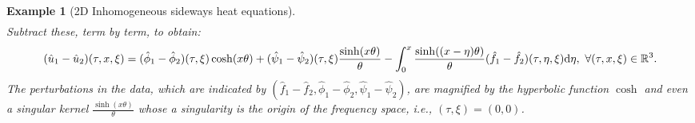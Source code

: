 \documentclass[oneside]{article}
\numberwithin{equation}{section}
\newtheorem{example}{Example}[section]
\begin{document}
\begin{example}[2D Inhomogeneous sideways heat equations]
\begin{align*}
    \end{align*}
    Subtract these, term by term, to obtain:
    \begin{align*}
        (\hat{u}_1 - \hat{u}_2)(\tau,x,\xi) = (\hat{\phi}_1 - \hat{\phi}_2)(\tau,\xi)\cosh(x\theta) + (\hat{\psi}_1 - \hat{\psi}_2)(\tau,\xi)\frac{\sinh(x\theta)}{\theta} - \int_0^x \frac{\sinh((x - \eta)\theta)}{\theta}(\hat{f}_1 - \hat{f}_2)(\tau,\eta,\xi){\rm d}\eta,\ \forall(\tau,x,\xi)\in\mathbb{R}^3.
    \end{align*}
    The perturbations in the data, which are indicated by $(\hat{f}_1 - \hat{f}_2,\hat{\phi}_1 - \hat{\phi}_2,\hat{\psi}_1 - \hat{\psi}_2)$, are magnified by the hyperbolic function $\cosh$ and even a singular kernel $\frac{\sinh(x\theta)}{\theta}$ whose a singularity is the origin of the frequency space, i.e., $(\tau,\xi) = (0,0)$.
    

\end{example}
\end{document}
